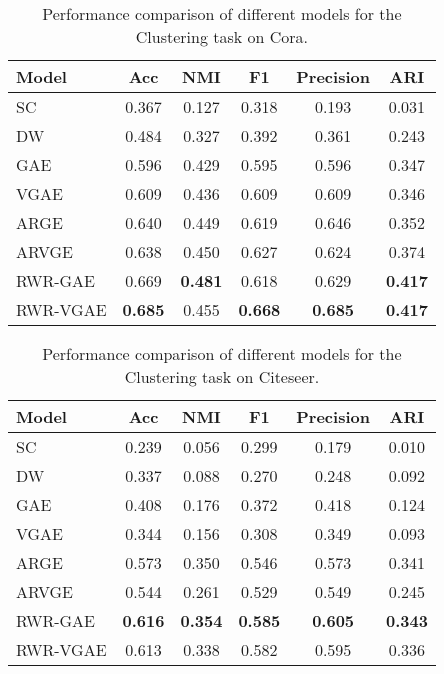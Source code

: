 \documentclass{article}
\begin{document}
\begin{table}[h]
\begin{center}
\begin{tabular}{lccccc}
\toprule
\bf Model & \bf Acc & \bf NMI & \bf F1 & \bf Precision & \bf ARI \\
\midrule
SC &  0.367 & 0.127 & 0.318 & 0.193 & 0.031\\
DW & 0.484 & 0.327 & 0.392 & 0.361 & 0.243\\
GAE & 0.596 & 0.429 & 0.595 & 0.596 & 0.347\\
VGAE & 0.609 & 0.436 & 0.609 & 0.609 & 0.346\\
ARGE & 0.640 & 0.449 & 0.619 & 0.646 & 0.352\\
ARVGE & 0.638 & 0.450 & 0.627 & 0.624 & 0.374\\
\midrule
RWR-GAE & 0.669	&\bf 0.481	& 0.618	& 0.629	&\bf 0.417\\
RWR-VGAE &\bf 0.685 & 0.455 &\bf 0.668 &\bf 0.685 &\bf 0.417\\
\bottomrule
\end{tabular}
\end{center}
\caption{Performance comparison of different models for the Clustering task on Cora.}
\label{results:nc:cora}
\end{table}

\begin{table}[h]
\begin{center}
\begin{tabular}{lccccc}
\toprule
\bf Model & \bf Acc & \bf NMI & \bf F1 & \bf Precision & \bf ARI \\
\midrule
SC & 0.239 &0.056 &0.299& 0.179 &0.010\\
DW & 0.337 &0.088 &0.270 &0.248 &0.092\\
GAE & 0.408 &0.176 &0.372 &0.418 &0.124\\
VGAE & 0.344 &0.156 &0.308 &0.349 &0.093\\
ARGE & 0.573 &0.350 &0.546 &0.573 &0.341\\
ARVGE & 0.544 &0.261 &0.529 &0.549 &0.245\\
\midrule
RWR-GAE &\bf 0.616	&\bf 0.354	&\bf 0.585	&\bf 0.605	&\bf 0.343\\
RWR-VGAE & 0.613	&0.338	&0.582	&0.595	&0.336\\
\bottomrule
\end{tabular}
\end{center}
\caption{Performance comparison of different models for the Clustering task on Citeseer.}
\label{results:nc:citeseer}
\end{table}
\end{document}
